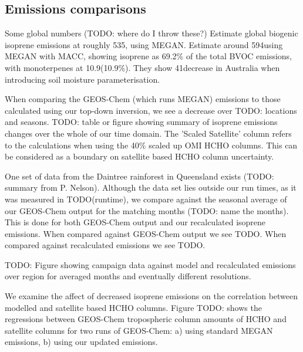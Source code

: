   \subsection{Emissions comparisons}
    
    Some global numbers (TODO: where do I throw these?)
    \citet{Guenther2012} Estimate global biogenic isoprene emissions at roughly 535\tgpyr, using MEGAN.
    \citet{Sindelarova2014} Estimate around 594\tgpyr using MEGAN with MACC, showing isoprene as 69.2\% of the total BVOC emissions, with monoterpenes at 10.9\tgpyr (10.9\%).
    They show 41\tgpyr decrease in Australia when introducing soil moisture parameterisation.
    
    
    When comparing the GEOS-Chem (which runs MEGAN) emissions to those calculated using our top-down inversion, we see a decrease over TODO: locations and seasons.
    TODO: table or figure showing summary of isoprene emissions changes over the whole of our time domain.
    The 'Scaled Satellite' column refers to the calculations when using the 40\% scaled up OMI HCHO columns. %
    This can be considered as a boundary on satellite based HCHO column uncertainty.
    
    One set of data from the Daintree rainforest in Queensland exists (TODO: summary from P. Nelson).
    Although the data set lies outside our run times, as it was measured in TODO(runtime), we compare against the seasonal average of our GEOS-Chem output for the matching months (TODO: name the months).
    This is done for both GEOS-Chem output and our recalculated isoprene emissions.
    When compared against GEOS-Chem output we see TODO.
    When compared against recalculated emissions we see TODO.
    
    TODO: Figure showing campaign data against model and recalculated emissions over region for averaged months and eventually different resolutions.
    
    We examine the affect of decreased isoprene emissions on the correlation between modelled and satellite based HCHO columns.
    Figure TODO: shows the regressions between GEOS-Chem tropospheric column amounts of HCHO and satellite columns for two runs of GEOS-Chem: a) using standard MEGAN emissions, b) using our updated emissions.
    
    
  
%  
  